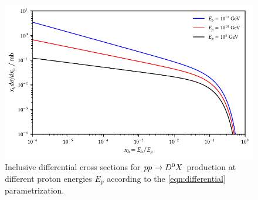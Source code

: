 \begin{figure}[H]
	\centering
	\includegraphics{../plots/build/charm_hadron_cross_section.pdf}
	\caption[Inclusive differential cross sections for $p \kern-0.1pt p \kern+0.6pt \rightarrow D^0 X \kern+0.5pt$ production.]{
			 Inclusive differential cross sections for $p \kern-0.1pt p \kern+0.6pt \rightarrow D^0 X \kern+0.5pt$ production at
			 different proton energies $E_p$ according to the \eqref{eqn:differential} parametrization.}
	\label{fig:charm-hadron-cross-section}
\end{figure}
